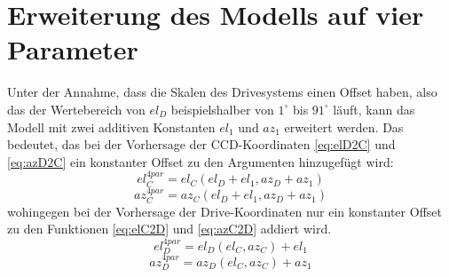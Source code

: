 \section{Erweiterung des Modells auf vier Parameter}
\label{se:4par}
Unter der Annahme, dass die Skalen des Drivesystems einen Offset haben, also das der Wertebereich von $el_D$ beispielshalber von $1^{\circ}$ bis $91^{\circ}$ läuft, kann das Modell mit zwei additiven Konstanten $el_1$ und $az_1$ erweitert werden. Das bedeutet, das bei der Vorhersage der CCD-Koordinaten \ref{eq:elD2C} und \ref{eq:azD2C} ein konstanter Offset zu den Argumenten hinzugefügt wird:
\begin{equation}
el_C^{4par}=el_C(el_D+el_1,az_D+az_1)
\label{eq:elD2C4}
\end{equation}
\begin{equation}
az_C^{4par}=az_C(el_D+el_1,az_D+az_1)
\label{eq:azD2C4}
\end{equation}
wohingegen bei der Vorhersage der Drive-Koordinaten nur ein konstanter Offset zu den Funktionen \ref{eq:elC2D} und \ref{eq:azC2D} addiert wird.
\begin{equation}
el_D^{4par}=el_D(el_C,az_C)+el_1
\label{eq:elC2D4}
\end{equation}
\begin{equation}
az_D^{4par}=az_D(el_C,az_C)+az_1
\label{eq:azC2D4}
\end{equation}